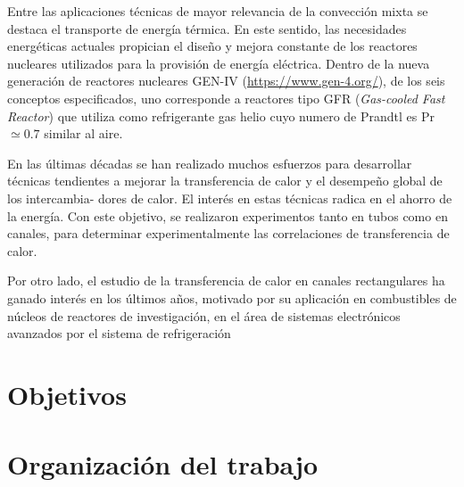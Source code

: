 Entre las aplicaciones técnicas de mayor relevancia de la convección mixta se destaca el transporte de energía térmica. En este sentido, las necesidades energéticas actuales propician el diseño y mejora constante de los reactores nucleares utilizados para la provisión de energía eléctrica. Dentro de la nueva generación de reactores nucleares GEN-IV (\url{https://www.gen-4.org/}), de los seis conceptos
especificados, uno corresponde a reactores tipo GFR (\textit{Gas-cooled Fast Reactor}) que utiliza como refrigerante gas helio cuyo numero de Prandtl es Pr$\simeq0.7$ similar al aire.





En las últimas décadas se han realizado muchos esfuerzos para desarrollar técnicas
tendientes a mejorar la transferencia de calor y el desempeño global de los intercambia-
dores de calor. El interés en estas técnicas radica en el ahorro de la energía. Con este
objetivo, se realizaron experimentos tanto en tubos como en canales, para determinar
experimentalmente las correlaciones de transferencia de calor.


Por otro lado, el estudio de la transferencia de calor en canales rectangulares ha
ganado interés en los últimos años, motivado por su aplicación en combustibles de
núcleos de reactores de investigación, en el área de sistemas electrónicos avanzados por el sistema de refrigeración



\section{Objetivos}

\section{Organización del trabajo}